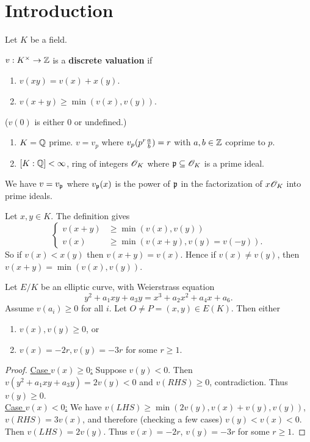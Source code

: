 \section{Introduction}
Let $K$ be a field. 
\begin{df}
$v:K^{\times}\to \mathbb{Z}$ is a \textbf{discrete valuation} if
\begin{enumerate}
\item
$v(xy)=v(x)+x(y)$.
\item
$v(x+y)\ge \min(v(x),v(y))$.
\end{enumerate}
($v(0)$ is either 0 or undefined.)
\end{df}
\begin{ex}
\begin{enumerate}
\item
$K=\mathbb{Q}$ prime. $v=v_p$ where $v_p(p^r\frac{a}{b})=r$ with $a,b\in \mathbb{Z}$ coprime to $p$.
\item
$[K:\mathbb{Q}]<\infty$, ring of integers $\mathscr{O}_K$ where $\mathfrak{p}\subseteq \mathscr{O}_K$ is a prime ideal.
\end{enumerate}
We have $v=v_{\mathfrak{p}}$ where $v_{\mathfrak{p}}(x)$ is the power of $\mathfrak{p}$ in the factorization of $x\mathscr{O}_K$ into prime ideals. 
\end{ex}
\begin{rem}
Let $x,y\in K$. The definition gives 
\[
\begin{cases}
v(x+y)&\ge \min(v(x),v(y))\\
v(x)&\ge \min(v(x+y),v(y)=v(-y)).
\end{cases}
\]
So if $v(x)<x(y)$ then $v(x+y)=v(x)$. Hence if $v(x)\ne v(y)$, then $v(x+y)=\min(v(x),v(y))$. 
\end{rem}
\begin{lem}
Let $E/K$ be an elliptic curve, with Weierstrass equation 
\[
y^2+a_1xy+a_3y=x^3+a_2x^2+a_4x+a_6.
\]
Assume $v(a_i)\ge 0$ for all $i$. Let $O\ne P=(x,y)\in E(K)$. Then either
\begin{enumerate}
\item
$v(x),v(y)\ge 0$, or
\item
$v(x)=-2r, v(y)=-3r$ for some $r\ge 1$.
\end{enumerate}
\end{lem}
\begin{proof}
\ul{Case $v(x)\ge 0$:} Suppose $v(y)<0$. Then $v(y^2+a_1xy+a_3y)=2v(y)<0$ and $v(RHS)\ge 0$, contradiction. Thus $v(y)\ge 0$.\\

\ul{Case $v(x)<0$:} We have $v(LHS)\ge \min(2v(y),v(x)+v(y),v(y))$, $v(RHS)=3v(x)$, and therefore (checking a few cases) $v(y)<v(x)<0$. Then $v(LHS)=2v(y)$. Thus $v(x)=-2r$, $v(y)=-3r$ for some $r\ge 1$.
\end{proof}

